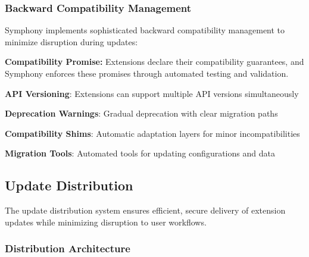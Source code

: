 \subsubsection{Backward Compatibility Management}
\label{subsubsec:backward-compatibility-management}

Symphony implements sophisticated backward compatibility management to minimize disruption during updates:

\begin{successbox}
\textbf{Compatibility Promise:} Extensions declare their compatibility guarantees, and Symphony enforces these promises through automated testing and validation.
\end{successbox}

\begin{compactlist}
\item \textbf{API Versioning}: Extensions can support multiple API versions simultaneously
\item \textbf{Deprecation Warnings}: Gradual deprecation with clear migration paths
\item \textbf{Compatibility Shims}: Automatic adaptation layers for minor incompatibilities
\item \textbf{Migration Tools}: Automated tools for updating configurations and data
\end{compactlist}

\subsection{Update Distribution}
\label{subsec:update-distribution}

The update distribution system ensures efficient, secure delivery of extension updates while minimizing disruption to user workflows.

\subsubsection{Distribution Architecture}
\label{subsubsec:distribution-architecture}

